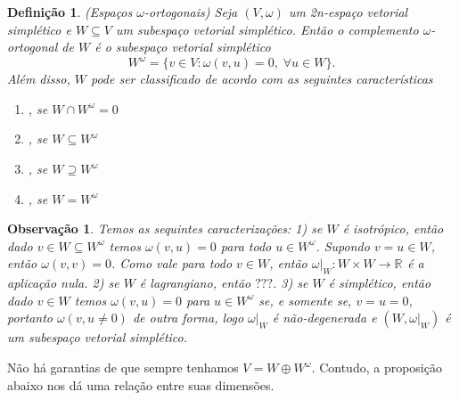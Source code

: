 \documentclass[12pt]{book}
\newtheorem{definicao}[teorema]{Definição}
\newtheorem{observacao}[teorema]{Observação}
\newcommand{\espacoSimpleticoOrtogonal}[1]{#1^{\omega}}
\newcommand{\real}[1]{\mathbb{R}^{#1}}
\newcommand{\reta}{\real{}}
\newcommand{\vermelho}[1]{{\color{red}#1}}
\begin{document}
	\begin{definicao}\label{definicao_subespaco_simpletico_ortogonais}
		(Espaços $\omega$-ortogonais) Seja $(V, \omega)$ um 2n-espaço vetorial simplético e $W\subseteq V$ um subespaço vetorial simplético. Então o complemento $\omega$-ortogonal de $W$ é o subespaço vetorial simplético
		$$
		W^{\omega} = \{v\in V: \omega(v,u) = 0,\;\forall u\in W \}.
		$$
		Além disso, $W$ pode ser classificado de acordo com as seguintes características
		\begin{enumerate}
			\item {}, se $W\cap \espacoSimpleticoOrtogonal{W} = 0$
			\item {}, se $W \subseteq \espacoSimpleticoOrtogonal{W}$
			\item {}, se $W\supseteq \espacoSimpleticoOrtogonal{W}$
			\item {}, se $W =\espacoSimpleticoOrtogonal{W}$
		\end{enumerate}
	\end{definicao}
	
	\begin{observacao}\label{observacao_subespaco_simpletico_ortogonal}
		Temos as sequintes caracterizações: 1) se $W$ é isotrópico, então dado $v \in W \subseteq \espacoSimpleticoOrtogonal{W}$ temos $\omega(v,u) = 0$ para todo $u\in \espacoSimpleticoOrtogonal{W}$. Supondo $v=u \in W$, então $\omega(v,v) = 0$. Como vale para todo $v\in W$, então $\omega|_{W}: W\times W \to \reta$ é a aplicação nula. \vermelho{2) se $W$ é lagrangiano, então $???$}. 3) se $W$ é simplético, então dado $v \in W$ temos $\omega(v, u) = 0$ para $u\in \espacoSimpleticoOrtogonal{W}$ se, e somente se, $v=u=0$, portanto $\omega(v,u \neq 0)$ de outra forma, logo $\omega|_{W}$ é não-degenerada e $(W, \omega|_{W})$ é um subespaço vetorial simplético.
	\end{observacao}
	
	Não há garantias de que sempre tenhamos $V = W\oplus\espacoSimpleticoOrtogonal{W}$. Contudo, a proposição abaixo nos dá uma relação entre suas dimensões.
	
\end{document}
